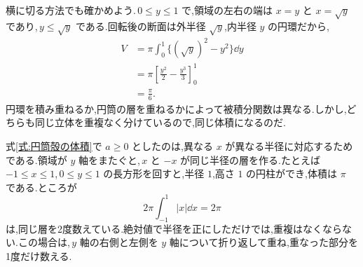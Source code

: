 横に切る方法でも確かめよう.\,$0\le y\le1$ で,領域の左右の端は $x=y$ と $x=\sqrt y$ であり,\,$y\le\sqrt y$ である.回転後の断面は外半径 $\sqrt y$,内半径 $y$ の円環だから,
\begin{align*}
V&=\pi\int_0^1\{(\sqrt y)^2-y^2\}\dd y\\
 &=\pi\left[\frac{y^2}{2}-\frac{y^3}{3}\right]_0^1\\
 &=\frac{\pi}{6}.
\end{align*}
円環を積み重ねるか,円筒の層を重ねるかによって被積分関数は異なる.しかし,どちらも同じ立体を重複なく分けているので,同じ体積になるのだ.

式\eqref{式:円筒殻の体積}で $a\ge0$ としたのは,異なる $x$ が異なる半径に対応するためである.領域が $y$ 軸をまたぐと,\,$x$ と $-x$ が同じ半径の層を作る.たとえば $-1\le x\le1$,\,$0\le y\le1$ の長方形を回すと,半径 $1$,高さ $1$ の円柱ができ,体積は $\pi$ である.ところが
\[
2\pi\int_{-1}^1|x|\dd x=2\pi
\]
は,同じ層を2度数えている.絶対値で半径を正にしただけでは,重複はなくならない.この場合は,\,$y$ 軸の右側と左側を $y$ 軸について折り返して重ね,重なった部分を1度だけ数える.
